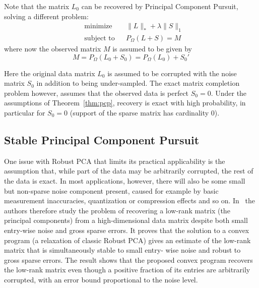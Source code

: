 Note that the matrix $L_0$ can be recovered by Principal Component Pursuit, solving a different problem:
\begin{equation}
\begin{aligned}
&\text{minimize} && \|L\|_* + \lambda \|S\|_1\\
&\text{subject to} && P_\Omega (L+S) = M
\end{aligned}
\end{equation}
where now the observed matrix $M$ is assumed to be given by
\[
M = P_\Omega (L_0 + S_0) = P_\Omega (L_0) + S_0'
\]

Here the original data matrix $L_0$ is assumed to be corrupted with the noise matrix $S_0$ in addition to being under-sampled. The exact matrix completion problem however, assumes that the observed data is perfect $S_0 = 0$. Under the assumptions of Theorem~\ref{thm:pcp}, recovery is exact with high probability, in particular for $S_0 = 0$ (support of the sparse matrix has cardinality $0$).




\subsection{Stable Principal Component Pursuit}
\label{related:stablePCP}

One issue with Robust PCA that limits its practical applicability is the assumption that, while part of the data may be arbitrarily corrupted, the rest of the data is exact. In most applications, however, there will also be some small but non-sparse noise component present, caused for example by basic measurement inaccuracies, quantization or compression effects and so on. In~\cite{Zhou:2010vn} the authors therefore study the problem of recovering a low-rank matrix (the principal components) from a high-dimensional data matrix despite both small entry-wise noise and gross sparse errors. It proves that the solution to a convex program (a relaxation of classic Robust PCA) gives an estimate of the low-rank matrix that is simultaneously stable to small entry- wise noise and robust to gross sparse errors. The result shows that the proposed convex program recovers the low-rank matrix even though a positive fraction of its entries are arbitrarily corrupted, with an error bound proportional to the noise level.

